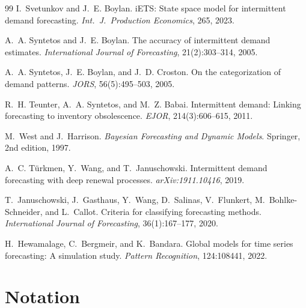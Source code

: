 \documentclass[twoside]{article}
\theoremstyle{definition}
\begin{document}
\begin{thebibliography}{99}
I.~Svetunkov and J.~E. Boylan.
\newblock iETS: State space model for intermittent demand forecasting.
\newblock \emph{Int.\ J.\ Production Economics}, 265, 2023.

A.~A. Syntetos and J.~E. Boylan.
\newblock The accuracy of intermittent demand estimates.
\newblock \emph{International Journal of Forecasting}, 21(2):303--314, 2005.

A.~A. Syntetos, J.~E. Boylan, and J.~D. Croston.
\newblock On the categorization of demand patterns.
\newblock \emph{JORS}, 56(5):495--503, 2005.

R.~H. Teunter, A.~A. Syntetos, and M.~Z. Babai.
\newblock Intermittent demand: Linking forecasting to inventory
  obsolescence.
\newblock \emph{EJOR}, 214(3):606--615, 2011.

M.~West and J.~Harrison.
\newblock \emph{Bayesian Forecasting and Dynamic Models}.
\newblock Springer, 2nd edition, 1997.

A.~C. T\"urkmen, Y.~Wang, and T.~Januschowski.
\newblock Intermittent demand forecasting with deep renewal processes.
\newblock \emph{arXiv:1911.10416}, 2019.


T.~Januschowski, J.~Gasthaus, Y.~Wang, D.~Salinas, V.~Flunkert,
M.~Bohlke-Schneider, and L.~Callot.
\newblock Criteria for classifying forecasting methods.
\newblock \emph{International Journal of Forecasting}, 36(1):167--177, 2020.

H.~Hewamalage, C.~Bergmeir, and K.~Bandara.
\newblock Global models for time series forecasting: A simulation study.
\newblock \emph{Pattern Recognition}, 124:108441, 2022.

\end{thebibliography}

\appendix
\onecolumn

\section{Notation}\label{app:notation}
\end{document}

